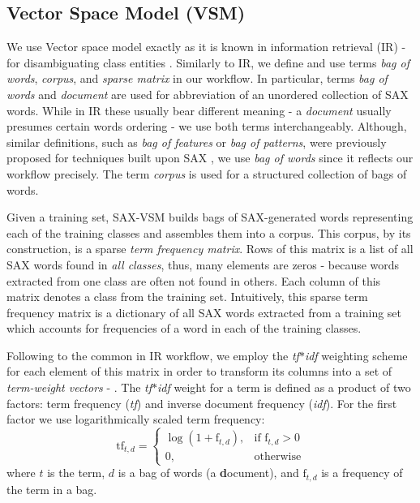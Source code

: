 \documentclass{llncs}
\begin{document}
\subsection{Vector Space Model (VSM)}
We use Vector space model exactly as it is known in information retrieval (IR) - 
for disambiguating class entities \cite{salton}. Similarly to IR, we define and use 
terms \textit{bag of words}, \textit{corpus}, and \textit{sparse matrix} in our workflow. 
In particular, terms \textit{bag of words} and \textit{document} are used 
for abbreviation of an unordered collection of SAX words. While in IR these 
usually bear different meaning - a \textit{document} usually presumes certain 
words ordering - we use both terms  interchangeably. 
Although, similar definitions, such as \textit{bag of features} or 
\textit{bag of patterns}, were previously proposed for techniques built upon 
SAX \cite{bag_patterns}, we use \textit{bag of words} since it reflects our 
workflow precisely. The term \textit{corpus} is used for a structured collection 
of bags of words. 

Given a training set, SAX-VSM builds bags of SAX-generated words representing 
each of the training classes and assembles them into a corpus. 
This corpus, by its construction, is a sparse \textit{term frequency matrix}. 
Rows of this matrix is a list of all SAX words found in \textit{all classes}, thus, 
many elements are zeros - because words extracted from one class are often 
not found in others. 
Each column of this matrix denotes a class from the training set. 
Intuitively, this sparse term frequency matrix is a dictionary of all SAX words 
extracted from a training set which accounts for frequencies of a word in 
each of the training classes.

Following to the common in IR workflow, we employ the \textit{tf$\ast$idf} weighting 
scheme for each element of this matrix in order to transform its columns into a 
set of \textit{term-weight vectors} - . 
The \textit{tf$\ast$idf} weight for a term is defined as a product of two factors: 
term frequency (\textit{tf}) and inverse document frequency (\textit{idf}). 
For the first factor we use logarithmically scaled term frequency:
\begin{equation}
 \mbox{tf}_{t, d} =  \begin{cases} \log(1 + \mbox{f}_{t,d}), &\mbox{if f}_{t,d}>0  \\
0, & \mbox{otherwise} \end{cases}
\end{equation} 
where $t$ is the term, $d$ is a bag of words (a \textbf{d}ocument), and $\mbox{f}_{t,d}$ 
is a frequency of the term in a bag.
\end{document}
